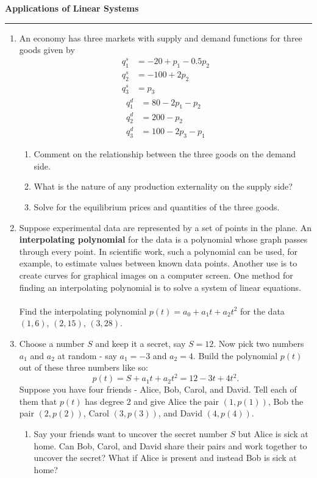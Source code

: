 \documentclass[12pt]{article}
\begin{document}
\begin{center}
{\bf \Large Applications of Linear Systems}
\vspace{0.2cm}
\hrule
\end{center}

\begin{enumerate}
	\item An economy has three markets with supply and demand functions for three goods given by
	\begin{align*}
		q_1^s&= -20 + p_1 -0.5p_2\\
		q_2^s&= -100 + 2p_2\\
		q_3^s&= p_3
	\end{align*}
	\begin{align*}
		q_1^d &= 80 - 2p_1-p_2\\
		q_2^d &= 200 - p_2\\
		q_3^d &= 100-2p_3-p_1
	\end{align*}
	\begin{enumerate}
		\item Comment on the relationship between the three goods on the demand side.
		\vfill
		\item What is the nature of any production externality on the supply side?
		\vfill
		\item Solve for the equilibrium prices and quantities of the three goods.
	\end{enumerate}
	\vfill

	\item Suppose experimental data are represented by a set of points in the plane. An \textbf{interpolating polynomial} for the data is a polynomial whose graph passes through every point. In scientific work, such a polynomial can be used, for example, to estimate values between known data points. Another use is to create curves for graphical images on a computer screen. One method for finding an interpolating polynomial is to solve a system of linear equations.\\\\Find the interpolating polynomial $p(t) = a_0+a_1t+a_2t^2$ for the data $(1, 6)$, $(2, 15)$, $(3, 28)$.
	\vfill\null\pagebreak

	\item Choose a number $S$ and keep it a secret, say $S = 12$. Now pick two numbers $a_1$ and $a_2$ at random - say $a_1 = -3$ and $a_2 = 4$. Build the polynomial $p(t)$ out of these three numbers like so:
	\[
	p(t) = S + a_1t + a_2t^2 = 12 - 3t + 4t^2.
	\]
	Suppose you have four friends - Alice, Bob, Carol, and David. Tell each of them that $p(t)$ has degree 2 and give Alice the pair $(1, p(1))$, Bob the pair $(2, p(2))$, Carol $(3, p(3))$, and David $(4, p(4))$.
	\begin{enumerate}
		\item Say your friends want to uncover the secret number $S$ but Alice is sick at home. Can Bob, Carol, and David share their pairs and work together to uncover the secret? What if Alice is present and instead Bob is sick at home?


\end{enumerate}
\end{enumerate}
\end{document}
